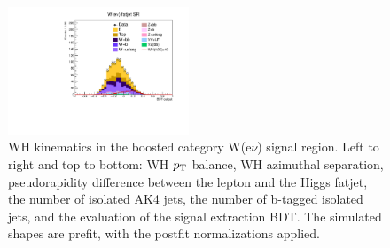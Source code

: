 \begin{figure}[tbp]
\begin{center}
    \includegraphics[width=0.48\textwidth]{figures/wlnhbb2016/boosted/WenWHFJSR_bdtValue.pdf}
    \caption{WH kinematics in the boosted category W(e$\nu$) signal region.
    Left to right and top to bottom: WH $p_{\mathrm{T}}$ balance, WH azimuthal separation,
    pseudorapidity difference between the lepton and the Higgs fatjet,
    the number of isolated AK4 jets, the number of b-tagged isolated jets,
    and the evaluation of the signal extraction BDT.
    The simulated shapes are prefit, with the postfit normalizations applied.}
    \label{fig:boost_WenSR_WH}
  \end{center}
\end{figure}
\clearpage

